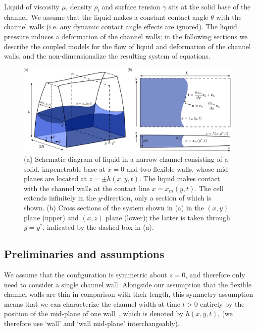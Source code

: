 \documentclass{jfm}
\begin{document}
 Liquid of viscosity $\mu$, density $\rho_l$ and surface tension $\gamma$ sits at the solid base of the channel. We assume that the liquid makes a constant contact angle $\theta$ with the channel walls (i.e. any dynamic contact angle effects are ignored). The liquid pressure induces a deformation of the channel walls; in the following sections we describe the coupled models for the flow of liquid and deformation of the channel walls, and the non-dimensionalize the resulting system of equations.

\begin{figure}
\centering
\includegraphics[width=0.99\textwidth]{figures/Schematic.pdf}
\caption{(a) Schematic diagram of liquid in a narrow channel consisting of a solid, impenetrable base at $x =0$ and two flexible walls, whose mid-planes are located at $z = \pm h(x,y,t)$. The liquid makes contact with the channel walls at the contact line $x = x_m(y,t)$. The cell extends infinitely in the $y$-direction, only a section of which is shown. (b) Cross sections of the system shown in (a) in the $(x,y)$ plane (upper) and $(x,z)$ plane (lower); the latter is taken through $y = y^*$, indicated by the dashed box in (a).}
\label{fig:Modelling:Schematic}
\end{figure}

\subsection{Preliminaries and assumptions}
We assume that the configuration is symmetric about $z = 0$, and therefore only need to consider a single channel wall. Alongside our assumption that the flexible channel walls are thin in comparison with their length, this symmetry assumption means that we can characterize the channel width at time $t > 0$ entirely by the position of the mid-plane of one wall~\citep{Reddy2006}, which is denoted by $h(x,y,t)$, (we therefore use `wall' and `wall mid-plane' interchangeably).
\end{document}
